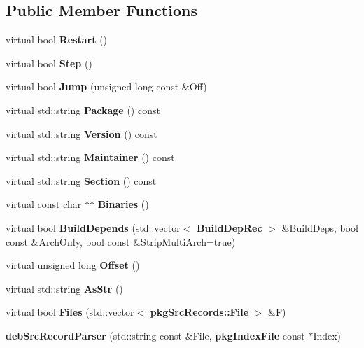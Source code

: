 \subsection*{\-Public \-Member \-Functions}
\begin{DoxyCompactItemize}
\item 
virtual bool {\bfseries \-Restart} ()\label{classdebSrcRecordParser_ae09824ea9dbf478b7bf84638f4b149e8}

\item 
virtual bool {\bfseries \-Step} ()\label{classdebSrcRecordParser_a5689f13aa38775aaec19f07fedbad42d}

\item 
virtual bool {\bfseries \-Jump} (unsigned long const \&\-Off)\label{classdebSrcRecordParser_ae8045693741d2bd9e7f156b701f8ec79}

\item 
virtual std\-::string {\bfseries \-Package} () const \label{classdebSrcRecordParser_affce21a2ce05bd28ff67bf5c8e8c4fc8}

\item 
virtual std\-::string {\bfseries \-Version} () const \label{classdebSrcRecordParser_a88c2ac44bdae88aef9b3730ac09a4c56}

\item 
virtual std\-::string {\bfseries \-Maintainer} () const \label{classdebSrcRecordParser_aa92a3f15b66a182a7b21f9a10e96580f}

\item 
virtual std\-::string {\bfseries \-Section} () const \label{classdebSrcRecordParser_a9e337cc68fcba095087d90f649cc44f0}

\item 
virtual const char $\ast$$\ast$ {\bfseries \-Binaries} ()\label{classdebSrcRecordParser_ab1c96e3ef785df89960b94c52eefc706}

\item 
virtual bool {\bfseries \-Build\-Depends} (std\-::vector$<$ {\bf \-Build\-Dep\-Rec} $>$ \&\-Build\-Deps, bool const \&\-Arch\-Only, bool const \&\-Strip\-Multi\-Arch=true)\label{classdebSrcRecordParser_a938d72cd2215482fa433351df51b00bc}

\item 
virtual unsigned long {\bfseries \-Offset} ()\label{classdebSrcRecordParser_a522e22486c2fd3219fad98a9df5f0ab2}

\item 
virtual std\-::string {\bfseries \-As\-Str} ()\label{classdebSrcRecordParser_a49cbc638245a4f31c13982dec0499bcd}

\item 
virtual bool {\bfseries \-Files} (std\-::vector$<$ {\bf pkg\-Src\-Records\-::\-File} $>$ \&\-F)\label{classdebSrcRecordParser_afdcb554e632ec9fbe6671841788b647a}

\item 
{\bfseries deb\-Src\-Record\-Parser} (std\-::string const \&\-File, {\bf pkg\-Index\-File} const $\ast$\-Index)\label{classdebSrcRecordParser_a6595c36babd3985433d38536038516d1}

\end{DoxyCompactItemize}


